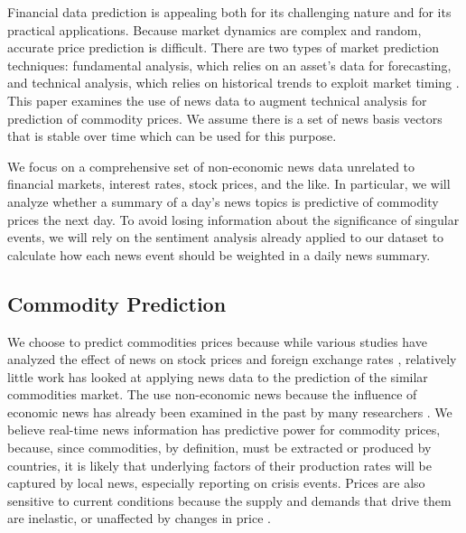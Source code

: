 Financial data prediction is appealing both for its challenging nature and for its practical applications. Because market dynamics are complex and random, accurate price prediction is difficult. There are two types of market prediction techniques: fundamental analysis, which relies on an asset's data for forecasting, and technical analysis, which relies on historical trends to exploit market timing \cite{schumaker2009textual}. This paper examines the use of news data to augment technical analysis for prediction of commodity prices. We assume there is a set of news basis vectors that is stable over time which can be used for this purpose. %

We focus on a comprehensive set of non-economic news data unrelated to financial markets, interest rates, stock prices, and the like. In particular, we will analyze whether a summary of a day's news topics is predictive of commodity prices the next day. To avoid losing information about the significance of singular events, we will rely on the sentiment analysis already applied to our dataset to calculate how each news event should be weighted in a daily news summary.

\subsection{Commodity Prediction}
We choose to predict commodities prices because while various studies have analyzed the effect of news on stock prices \cite{mcqueen1993stock} and foreign exchange rates \cite{kamruzzaman2003svm}, relatively little work has looked at applying news data to the prediction of the similar commodities market. The use non-economic news because the influence of economic news has already been examined in the past by many researchers \cite{gidofalvi2001using}\cite{schumaker2009textual}\cite{bollen2011twitter}\cite{hagenau2012automated}. We believe real-time news information has predictive power for commodity prices, because, since commodities, by definition, must be extracted or produced by countries, it is likely that underlying factors of their production rates will be captured by local news, especially reporting on crisis events. Prices are also sensitive to current conditions because the supply and demands that drive them are inelastic, or unaffected by changes in price \cite{chen2008can}. 

